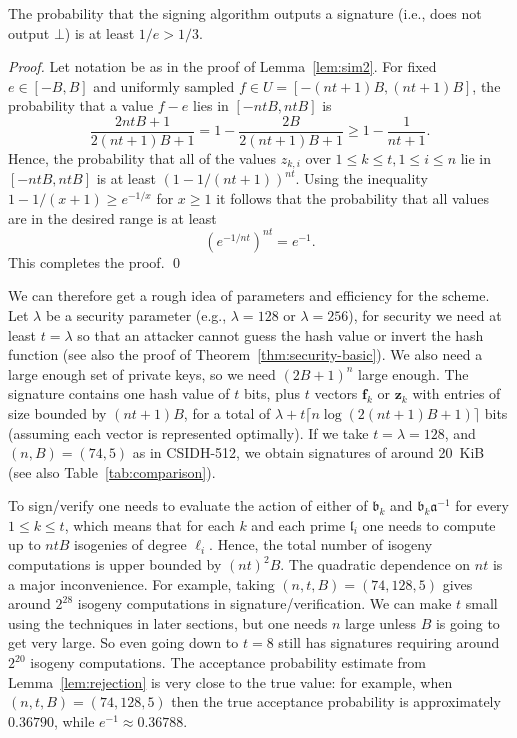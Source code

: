 \documentclass{llncs}
\renewcommand{\a}{\mathfrak{a}}
\renewcommand{\b}{\mathfrak{b}}
\renewcommand{\l}{\mathfrak{l}}
\newcommand{\f}{\mathbf{f}}
\newcommand{\z}{\mathbf{z}}
\begin{document}
\begin{lemma}\label{lem:rejection}
The probability that the signing algorithm outputs a signature (i.e., does not output $\bot$) is at least $1/e > 1/3$.
\end{lemma}

\begin{proof}
Let notation be as in the proof of Lemma~\ref{lem:sim2}.
For fixed $e \in [-B, B]$ and uniformly sampled $f \in U = [-(nt+1)B, (nt+1)B]$, the probability that a value $f-e$ lies in $[-ntB, ntB]$ is
\[
   \frac{2ntB + 1}{2(nt+1)B + 1}  = 1 - \frac{2B}{2(nt+1)B + 1} \ge 1 - \frac{1}{nt+1}.
\]
Hence, the probability that all of the values $z_{k,i}$ over $1 \le k \le t, 1 \le i \le n$ lie in $[-ntB, ntB]$ is at least $(1 - 1/(nt+1))^{nt}$.
Using the inequality $1 - 1/(x+1) \ge e^{-1/x}$ for $x \ge 1$ it follows that the probability that all values are in the desired range is at least
\[
   \left( e^{-1/nt} \right)^{nt} = e^{-1}.
\]
This completes the proof. \qed
\end{proof}





We can therefore get a rough idea of parameters and efficiency for the scheme.
Let $\lambda$ be a security parameter (e.g., $\lambda=128$ or $\lambda=256$), for security
we need at least $t=\lambda$ so that an attacker cannot guess the hash value or invert the hash function (see also the proof of Theorem~\ref{thm:security-basic}).
We also need a large enough set of private keys, so we need $(2B+1)^n$ large enough.
The signature contains one hash value of $t$ bits, plus $t$ vectors $\f_k$ or $\z_k$ with entries of size bounded by $(nt+1)B$, for a total of $\lambda + t\lceil n\log(2(nt+1)B + 1)\rceil$ bits (assuming each vector is represented optimally). If we take $t=\lambda=128$, and $(n,B)=(74,5)$ as in CSIDH-512, we obtain signatures of around 20~KiB (see also Table~\ref{tab:comparison}).

To sign/verify one needs to evaluate the action of either of $\b_k$ and $\b_k\a^{-1}$ for every $1\le k\le t$,
which means that for each $k$ and each prime $\l_i$ one needs to compute up to $ntB$ isogenies of degree $\ell_i$.
Hence, the total number of isogeny computations is upper bounded by $(nt)^2 B$.
The quadratic dependence on $nt$ is a major inconvenience.
For example, taking $(n,t,B)=(74,128,5)$ gives around $2^{28}$ isogeny computations in signature/verification.
We can make $t$ small using the techniques in later sections, but one needs $n$ large unless $B$ is going to get very large. So even going down to $t=8$ still has signatures requiring around $2^{20}$ isogeny computations.
The acceptance probability estimate from Lemma~\ref{lem:rejection} is very close to the true value: for example, when $(n,t,B)=(74,128,5)$ then the true acceptance probability is approximately $0.36790$, while $e^{-1} \approx 0.36788$.
\end{document}
